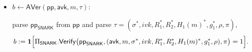 \documentclass{article}
\newcommand{\ppSNARK}[0]{\mathsf{pp}_{\mathsf{SNARK}}}
\newcommand{\pp}[0]{\mathsf{pp}}
\newcommand{\avk}[0]{\mathsf{avk}}
\newcommand{\topic}[0]{\mathsf{topic}}
\begin{document}
\begin{itemize}



    \item $b \leftarrow \mathsf{AVer}(\pp,\avk,m,\tau)$:
    
          parse $\ppSNARK$ from $\pp$ and parse $\tau=(\sigma^*,ivk,R_1^*,R_2^*,H_1(m)^*,g_1^*,\rho,\pi)$,
          \[
            b := \mathbf{1}\Bigl[\Pi_{\mathsf{SNARK}}.\mathsf{Verify}\bigl(\ppSNARK,(\avk,m,\sigma^*,ivk,R_1^*,R_2^*,H_1(m)^*,g_1^*,\rho),\pi\bigr)=1\Bigr].
          \]

\end{itemize}
\end{document}
